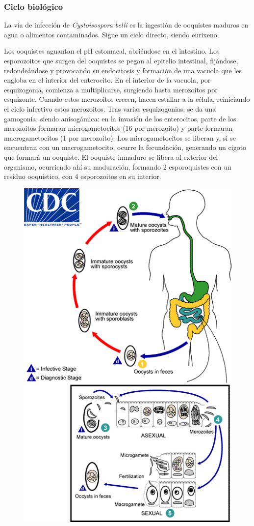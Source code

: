 \begin{multicols}{2}
	\subsubsection{Ciclo biológico}
	La vía de infección de \textit{Cystoisospora belli} es la ingestión de ooquistes maduros en agua o alimentos contaminados. Sigue un ciclo directo, siendo eurixeno.
	
	Los ooquistes aguantan el pH estomacal, abriéndose en el intestino. Los esporozoitos que surgen del ooquistes se pegan al epitelio intestinal, fijándose, redondeándose y provocando su endocitosis y formación de una vacuola que les engloba en el interior del enterocito. En el interior de la vacuola, por esquizogonia, comienza a multiplicarse, surgiendo hasta merozoitos por esquizonte. Cuando estos merozoitos crecen, hacen estallar a la célula, reiniciando el ciclo infectivo estos merozoitos. Tras varias esquizogonias, se da una gamogonia, siendo anisogámica: en la invasión de los enterocitos, parte de los merozoitos formaran microgametocitos (16 por merozoito) y parte formaran macrogametocitos (1 por merozoito). Los microgametocitos se liberan y, si se encuentran con un macrogametocito, ocurre la fecundación, generando un cigoto que formará un ooquiste. El ooquiste inmaduro se libera al exterior del organismo, ocurriendo ahí su maduración, formando 2 esporoquistes con un residuo ooquistico, con 4 esporozoitos en su interior.
	\columnbreak
	\begin{figure}[H]
		\centering
		\includegraphics[width=0.85\columnwidth]{A.imagenes/ACV-BioSan-Parasit-CbelliCbios}

\end{figure}
\end{multicols}
